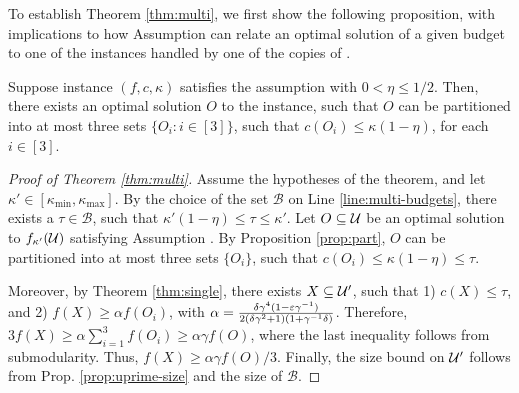 To establish Theorem \ref{thm:multi}, we first show the following proposition,
with implications to how Assumption \nhi can relate an optimal solution of a given
budget to one of the instances handled by one of the copies of \qss. 
\begin{proposition} \label{prop:part}
  Suppose instance $(f,c,\kappa)$ satisfies the \nhi assumption
  with $0 < \eta \le 1/2$. 
  Then, there exists an optimal solution $O$ to the instance, such
  that $O$ can be partitioned into at most three sets $\{ O_i : i \in [3] \}$, such
  that $c(O_i) \le \kappa (1 - \eta )$, for each $i \in [3]$. 
\end{proposition}
\begin{proof}[Proof of Theorem \ref{thm:multi}]
  Assume the hypotheses of the theorem, and let
  $\kappa' \in [\kappa_{\min}, \kappa_{\max}]$. By the choice of
  the set $\mathcal B$ on Line \ref{line:multi-budgets}, there
  exists a $\tau \in \mathcal B$, such that $\kappa'(1 - \eta) \le \tau \le \kappa'$.
  Let $O \subseteq \mathcal{U}$ be an optimal solution to $f_{\kappa'}( \mathcal{U} )$
  satisfying Assumption \nhi. By Proposition \ref{prop:part}, $O$ can be partitioned
  into at most three sets $\{ O_i \}$, such that $c( O_i ) \le \kappa ( 1 - \eta ) \le \tau$.

  Moreover, by Theorem \ref{thm:single}, there exists $X \subseteq \mathcal{U}'$, such that
  1) $c(X) \le \tau$, and 
  2) $f(X) \ge
  \alpha f( O_i )$,
  with $\alpha =  \frac{\delta \gamma^4(1 - \varepsilon \gamma^{-1})}{2(\delta \gamma^2 + 1)( 1 + \gamma^{-1} \delta ) }$.
  Therefore, $3f(X) \ge \alpha \sum_{i = 1}^3 f( O_i ) \ge \alpha \gamma f(O)$, where the last inequality follows from submodularity.
  Thus, $f(X) \ge \alpha \gamma f(O) / 3$.
  Finally, the size bound on $\mathcal{U}'$
  follows from Prop. \ref{prop:uprime-size} and the size of $\mathcal B$. 
\end{proof}
  
